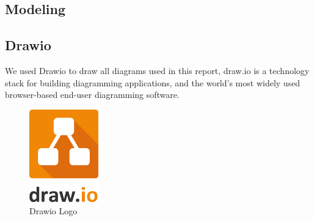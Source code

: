 \subsection{Modeling}
\subsection*{Drawio}
We used Drawio to draw all diagrams used in this report,
draw.io is a technology stack for building diagramming applications, and the world’s most widely used browser-based end-user diagramming software. \cite{Drawio}
\begin{figure}[H]
    \centering
    \includegraphics[height=4cm]{images/chap1/drawio.png}
    \caption{Drawio Logo}
    \label{fig:enter-label}
\end{figure}
